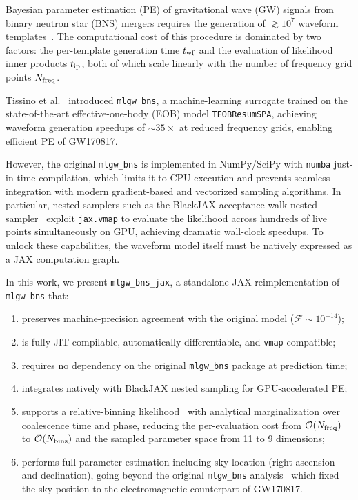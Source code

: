 \documentclass[twocolumn,superscriptaddress,nofootinbib,aps,prd]{revtex4-2}
\begin{document}
Bayesian parameter estimation (PE) of gravitational wave (GW) signals from
binary neutron star (BNS) mergers requires the generation of $\gtrsim 10^7$
waveform templates~\cite{Veitch:2014wba,Breschi:2021wzr}.  The computational
cost of this procedure is dominated by two factors: the per-template
generation time $t_{\rm wf}$ and the evaluation of likelihood inner products
$t_{\rm ip}$, both of which scale linearly with the number of frequency grid
points $N_{\rm freq}$.

Tissino et al.~\cite{Tissino:2022} introduced \texttt{mlgw\_bns}, a
machine-learning surrogate trained on the state-of-the-art effective-one-body
(EOB) model \texttt{TEOBResumSPA}, achieving waveform generation speedups of
$\sim\!35\times$ at reduced frequency grids, enabling efficient PE of GW170817.

However, the original \texttt{mlgw\_bns} is implemented in NumPy/SciPy with
\texttt{numba} just-in-time compilation, which limits it to CPU execution and
prevents seamless integration with modern gradient-based and vectorized
sampling algorithms.  In particular, nested samplers such as the BlackJAX
acceptance-walk nested sampler~\cite{BlackJAX,Handley:2015fda} exploit
\texttt{jax.vmap} to evaluate the likelihood across hundreds of live points
simultaneously on GPU, achieving dramatic wall-clock speedups.  To unlock
these capabilities, the waveform model itself must be natively expressed as a
JAX computation graph.

In this work, we present \texttt{mlgw\_bns\_jax}, a standalone JAX
reimplementation of \texttt{mlgw\_bns} that:
\begin{enumerate}
    \item preserves machine-precision agreement with the original model
          ($\bar{\mathcal{F}} \sim 10^{-14}$);
    \item is fully JIT-compilable, automatically differentiable, and
          \texttt{vmap}-compatible;
    \item requires no dependency on the original \texttt{mlgw\_bns} package
          at prediction time;
    \item integrates natively with BlackJAX nested sampling for GPU-accelerated PE;
    \item supports a relative-binning likelihood~\cite{Zackay:2018} with
          analytical marginalization over coalescence time and phase, reducing
          the per-evaluation cost from $\mathcal{O}(N_{\rm freq})$ to
          $\mathcal{O}(N_{\rm bins})$ and the sampled parameter space from
          11 to 9 dimensions;
    \item performs full parameter estimation including sky location (right
          ascension and declination), going beyond the original
          \texttt{mlgw\_bns} analysis~\cite{Tissino:2022} which fixed the
          sky position to the electromagnetic counterpart of GW170817.
\end{enumerate}
\end{document}
